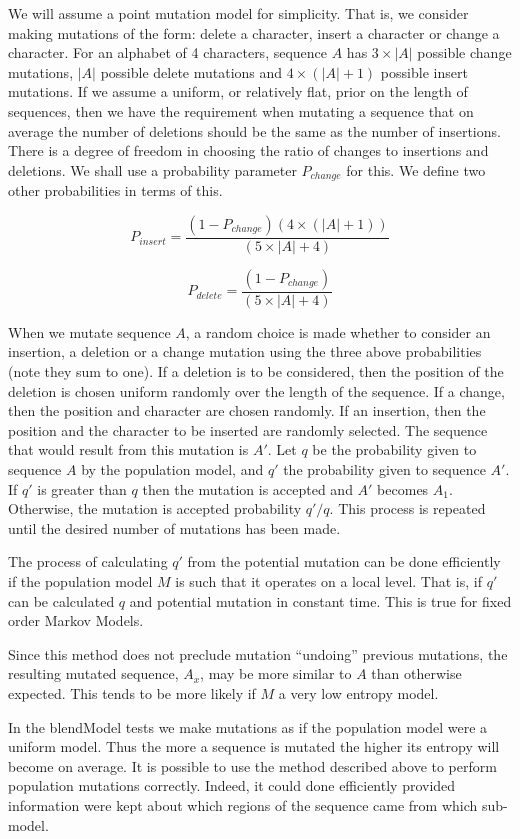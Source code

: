 \documentclass[letterpaper,11pt,oneside]{article}
\begin{document}
We will assume a point mutation model for simplicity.  That is, we consider
making mutations of the form: delete a character, insert a character or change
a character.  For an alphabet of 4 characters, sequence $A$ has $3\times|A|$
possible change mutations, $|A|$ possible delete mutations and
$4\times(|A|+1)$ possible insert mutations.  If we assume a uniform, or
relatively flat, prior on the length of sequences, then we have the
requirement when mutating a sequence that on average the number of deletions
should be the same as the number of insertions.  There is a degree of freedom
in choosing the ratio of changes to insertions and deletions.  We shall use a
probability parameter $P_{change}$ for this.  We define two other probabilities
in terms of this.

$$P_{insert} = \frac{(1-P_{change})(4\times(|A|+1))}{(5\times|A|+4)}$$

$$P_{delete} = \frac{(1-P_{change})}{(5\times|A|+4)}$$

When we mutate sequence $A$, a random choice is made whether to consider an
insertion, a deletion or a change mutation using the three above probabilities
(note they sum to one).  If a deletion is to be considered, then the position
of the deletion is chosen uniform randomly over the length of the sequence.
If a change, then the position and character are chosen randomly.  If an
insertion, then the position and the character to be inserted are randomly
selected.  The sequence that would result from this mutation is $A'$.  Let
$q$ be the probability given to sequence $A$ by the population model, and $q'$
the probability given to sequence $A'$.  If $q'$ is greater than $q$ then the
mutation is accepted and $A'$ becomes $A_1$.  Otherwise, the mutation is
accepted probability $q'/q$.  This process is repeated until the desired
number of mutations has been made.

The process of calculating $q'$ from the potential mutation can be done
efficiently if the population model $M$ is such that it operates on a local
level.  That is, if $q'$ can be calculated $q$ and potential mutation in
constant time.  This is true for fixed order Markov Models.

Since this method does not preclude mutation ``undoing'' previous mutations,
the resulting mutated sequence, $A_x$, may be more similar to $A$ than
otherwise expected.  This tends to be more likely if $M$ a very low entropy
model.

In the blendModel tests we make mutations as if the population model were a
uniform model.  Thus the more a sequence is mutated the higher its entropy
will become on average.  It is possible to use the method described above to
perform population mutations correctly.  Indeed, it could done efficiently
provided information were kept about which regions of the sequence came from
which sub-model.
\end{document}
